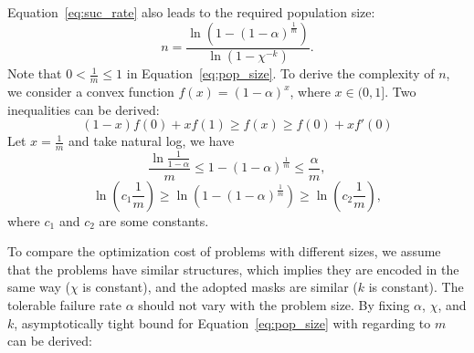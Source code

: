 \documentclass{sig-alternate}
\begin{document}
Equation~\ref{eq:suc_rate} also leads to the required population size:
\begin{equation} \label{eq:pop_size}
n=\frac{\ln\left({1-\left(1-\alpha\right)^{\frac{1}{m}}}\right)}{\ln\left({1-\chi^{-k}}\right)}.
\end{equation}
Note that $0<\frac{1}{m}\leq1$ in Equation~\ref{eq:pop_size}.
To derive the complexity of $n$,
we consider a convex function 
$f\left(x\right)=\left(1-\alpha\right)^x$,
where $x\in(0,1]$.
Two inequalities can be derived:
%
\begin{equation*}
\left(1-x\right)f\left(0\right)+x f\left(1\right)\geq f\left(x\right)\geq f\left(0\right)+x f'\left(0\right)
\end{equation*}
Let $x=\frac{1}{m}$ and take natural log, we have
\begin{equation*}
\frac{\ln\frac{1}{1-\alpha}}{m}\leq 1-\left(1-\alpha\right)^\frac{1}{m} \leq \frac{\alpha}{m},
\end{equation*}
\begin{equation*}
\ln\left( c_1 \frac{1}{m}\right) \geq\ln\left(1-\left(1-\alpha\right)^\frac{1}{m}\right) \geq \ln\left(c_2 \frac{1}{m}\right),
\end{equation*}
where $c_1$ and $c_2$ are some constants.


To compare the optimization cost of problems with different sizes, we assume that the problems have similar structures,
which implies they are encoded in the same way ($\chi$ is constant),
and the adopted masks are similar ($k$ is constant).
The tolerable failure rate $\alpha$ should not vary with the problem size.
By fixing $\alpha$, $\chi$, and $k$,
asymptotically tight bound for Equation~\ref{eq:pop_size} with regarding to $m$ can be derived:
\end{document}
